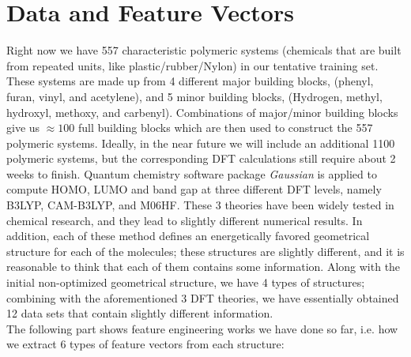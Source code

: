 \documentclass[12pt, oneside]{article}   	%
\begin{document}
\section{Data and Feature Vectors}


\noindent Right now we have 557 characteristic polymeric systems (chemicals that are built from repeated units, like plastic/rubber/Nylon) in our tentative training set. These systems are made up from 4 different major building blocks, (phenyl, furan, vinyl, and acetylene), and 5 minor building blocks, (Hydrogen, methyl, hydroxyl, methoxy, and carbenyl). Combinations of major/minor building blocks give us $\approx 100$ full building blocks which are then used to construct the 557 polymeric systems. Ideally, in the near future we will include an additional 1100 polymeric systems, but the corresponding DFT calculations still require about 2 weeks to finish. Quantum chemistry software package \textit{Gaussian} \cite{gaussian} is applied to compute HOMO, LUMO and band gap at three different DFT levels, namely B3LYP, CAM-B3LYP, and M06HF. These 3 theories have been widely tested in chemical research, and they lead to slightly different numerical results. In addition, each of these method defines an energetically favored geometrical structure for each of the molecules; these structures are slightly different, and it is reasonable to think that each of them contains some information. Along with the initial non-optimized geometrical structure, we have 4 types of structures; combining with the aforementioned 3 DFT theories, we have essentially obtained 12 data sets that contain slightly different information. \\


The following part shows feature engineering works we have done so far, i.e. how we extract 6 types of feature vectors from each structure:
\end{document}
